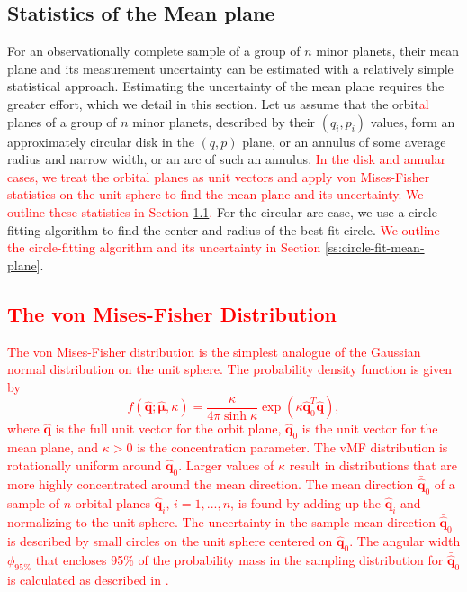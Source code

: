 \documentclass[a4paper,fleqn]{cas-sc}
\begin{document}
\begin{linenumbers}
\section{Statistics of the Mean plane}
\label{s:mean-plane-statistics}
For an observationally complete sample of a group of $n$ minor planets, their mean plane and its measurement uncertainty can be estimated with a relatively simple statistical approach. 
Estimating the uncertainty of the mean plane requires the greater effort, which we detail in this section. 
Let us assume that the orbit\textcolor{red}{al} planes of a group of $n$ minor planets, described by their $(q_i,p_i)$ values, form an approximately circular disk in the $(q,p)$ plane, or an annulus of some average radius and narrow width, or an arc of such an annulus.
\textcolor{red}{In the disk and annular cases, we treat the orbital planes as unit vectors and apply von Mises-Fisher statistics on the unit sphere to find the mean plane and its uncertainty. 
We outline these statistics in Section \ref{ss:vmf-distribution}.}
For the circular arc case, we use a circle-fitting algorithm to find the center and radius of the best-fit circle.
\textcolor{red}{We outline the circle-fitting algorithm and its uncertainty in Section \ref{ss:circle-fit-mean-plane}}.




\subsection{\textcolor{red}{The von Mises-Fisher Distribution}}
\label{ss:vmf-distribution}


\textcolor{red}{
The von Mises-Fisher distribution is the simplest analogue of the Gaussian normal distribution on the unit sphere.
The probability density function is given by
\begin{equation}
\label{e:vmf-density}
f(\hat{\mathbf{q}};\hat{\mathbf{\mu}},\kappa)=\frac{\kappa}{4\pi\sinh\kappa}\exp\left( \kappa \hat{\mathbf{q}}_0^T \hat{\mathbf{q}} \right),
\end{equation}
where $\hat{\mathbf{q}}$ is the full unit vector for the orbit plane, $\hat{\mathbf{q}}_0$ is the unit vector for the mean plane, and $\kappa>0$ is the concentration parameter.
}
\textcolor{red}{
The vMF distribution is rotationally uniform around $\hat{\mathbf{q}}_0$.
Larger values of $\kappa$ result in distributions that are more highly concentrated around the mean direction.
The mean direction $\bar{\hat{\mathbf{q}}}_0$ of a sample of $n$ orbital planes $\hat{\mathbf{q}}_i$, $i=1,...,n$, is found by adding up the $\hat{\mathbf{q}}_i$ and normalizing to the unit sphere.
The uncertainty in the sample mean direction $\bar{\hat{\mathbf{q}}}_0$ is described by small circles on the unit sphere centered on $\bar{\hat{\mathbf{q}}}_0$.
The angular width $\phi_{95\%}$ that encloses 95\% of the probability mass in the sampling distribution for $\bar{\hat{\mathbf{q}}}_0$ is calculated as described in \citet{mmk23}.
}


\end{linenumbers}
\end{document}

